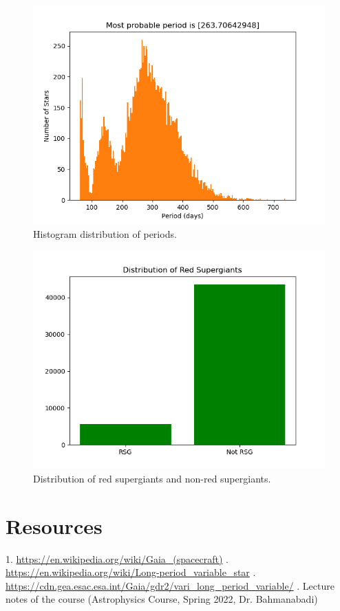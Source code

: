 \documentclass[12pt,a4paper]{article}
\begin{document}
	\begin{figure}[ht]
		\centering
		\caption{Histogram distribution of periods.}
		\includegraphics[width=0.6\linewidth]{P_s_disturb.png}
	\end{figure}

	\begin{figure}[ht]
		\centering
		\caption{Distribution of red supergiants and non-red supergiants.}
		\includegraphics[width=0.6\linewidth]{rsg_disturb.png}
	\end{figure}	

\newpage
\section*{Resources}
1. \url{https://en.wikipedia.org/wiki/Gaia_(spacecraft)}
. \url{https://en.wikipedia.org/wiki/Long-period_variable_star}
. \url{https://cdn.gea.esac.esa.int/Gaia/gdr2/vari_long_period_variable/}
. Lecture notes of the course (Astrophysics Course, Spring 2022, Dr. Bahmanabadi)
\end{document}
